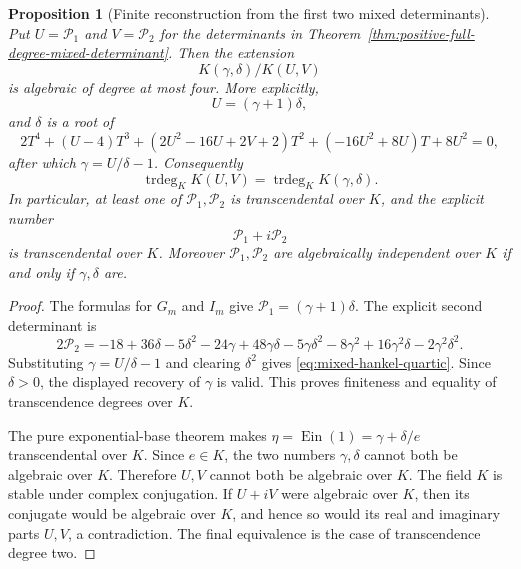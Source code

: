 \documentclass[11pt]{article}
\newtheorem{proposition}[theorem]{Proposition}
\theoremstyle{definition}
\theoremstyle{remark}
\newcommand{\Ein}{\operatorname{Ein}}
\begin{document}
\begin{proposition}[Finite reconstruction from the first two mixed determinants]
\label{prop:mixed-hankel-reconstruction}
Put $U=\mathcal P_1$ and $V=\mathcal P_2$ for the determinants in
Theorem~\ref{thm:positive-full-degree-mixed-determinant}.  Then the extension
\[
 K(\gamma,\delta)/K(U,V)
\]
is algebraic of degree at most four.  More explicitly,
\[
 U=(\gamma+1)\delta,
\]
and $\delta$ is a root of
\begin{equation}\label{eq:mixed-hankel-quartic}
 2T^4+(U-4)T^3
 +(2U^2-16U+2V+2)T^2
 +(-16U^2+8U)T+8U^2=0,
\end{equation}
after which $\gamma=U/\delta-1$.
Consequently
\[
 \operatorname{trdeg}_K K(U,V)
 =\operatorname{trdeg}_K K(\gamma,\delta).
\]
In particular, at least one of $\mathcal P_1,\mathcal P_2$ is
transcendental over $K$, and the explicit number
\[
 \mathcal P_1+i\mathcal P_2
\]
is transcendental over $K$.  Moreover $\mathcal P_1,\mathcal P_2$ are
algebraically independent over $K$ if and only if $\gamma,\delta$ are.
\end{proposition}

\begin{proof}
The formulas for $G_m$ and $I_m$ give
$\mathcal P_1=(\gamma+1)\delta$.  The explicit second determinant is
\[
 2\mathcal P_2=-18+36\delta-5\delta^2-24\gamma
 +48\gamma\delta-5\gamma\delta^2-8\gamma^2
 +16\gamma^2\delta-2\gamma^2\delta^2.
\]
Substituting $\gamma=U/\delta-1$ and clearing $\delta^2$ gives
\eqref{eq:mixed-hankel-quartic}.  Since $\delta>0$, the displayed
recovery of $\gamma$ is valid.  This proves finiteness and equality of
transcendence degrees over $K$.

The pure exponential-base theorem makes
$\eta=\Ein(1)=\gamma+\delta/e$ transcendental over $K$.  Since $e\in K$,
the two numbers $\gamma,\delta$ cannot both be algebraic over $K$.
Therefore $U,V$ cannot both be algebraic over $K$.  The field $K$ is
stable under complex conjugation.  If $U+iV$ were algebraic over $K$,
then its conjugate would be algebraic over $K$, and hence so would its
real and imaginary parts $U,V$, a contradiction.  The final equivalence
is the case of transcendence degree two.
\end{proof}

\end{document}
